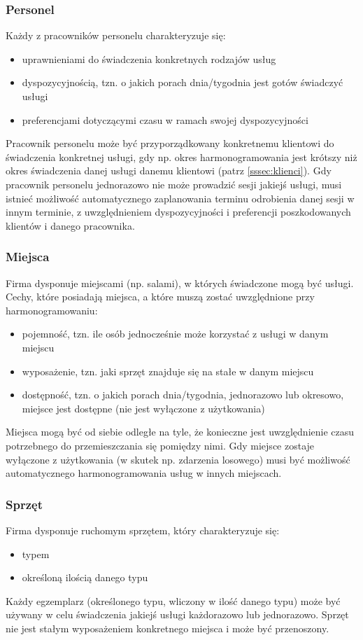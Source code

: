 \subsubsection{Personel}\label{sssec:personel}
Każdy z pracowników personelu charakteryzuje się:
\begin{itemize}
	\item{uprawnieniami do świadczenia konkretnych rodzajów usług}
	\item{dyspozycyjnością, tzn. o jakich porach dnia/tygodnia jest gotów świadczyć usługi}
	\item{preferencjami dotyczącymi czasu w ramach swojej dyspozycyjności}
\end{itemize}
Pracownik personelu może być przyporządkowany konkretnemu klientowi do świadczenia konkretnej usługi, gdy np. okres harmonogramowania jest krótszy niż okres świadczenia danej usługi danemu klientowi (patrz \ref{sssec:klienci}).
Gdy pracownik personelu jednorazowo nie może prowadzić sesji jakiejś usługi, musi istnieć możliwość automatycznego zaplanowania terminu odrobienia danej sesji w innym terminie, z uwzględnieniem dyspozycyjności i preferencji poszkodowanych klientów i danego pracownika.

\subsubsection{Miejsca}\label{sssec:miejsca}
Firma dysponuje miejscami (np. salami), w których świadczone mogą być usługi. Cechy, które posiadają miejsca, a które muszą zostać uwzględnione przy harmonogramowaniu:
\begin{itemize}
	\item{pojemność, tzn. ile osób jednocześnie może korzystać z usługi w danym miejscu}
	\item{wyposażenie, tzn. jaki sprzęt znajduje się na stałe w danym miejscu}
	\item{dostępność, tzn. o jakich porach dnia/tygodnia, jednorazowo lub okresowo, miejsce jest dostępne (nie jest wyłączone z użytkowania)}
\end{itemize}
Miejsca mogą być od siebie odległe na tyle, że konieczne jest uwzględnienie czasu potrzebnego do przemieszczania się pomiędzy nimi.
Gdy miejsce zostaje wyłączone z użytkowania (w skutek np. zdarzenia losowego) musi być możliwość automatycznego harmonogramowania usług w innych miejscach.

\subsubsection{Sprzęt}\label{sssec:sprzet}
Firma dysponuje ruchomym sprzętem, który charakteryzuje się:
\begin{itemize}
	\item{typem}
	\item{określoną ilością danego typu}
\end{itemize}
Każdy egzemplarz (określonego typu, wliczony w ilość danego typu) może być używany w celu świadczenia jakiejś usługi każdorazowo lub jednorazowo.
Sprzęt nie jest stałym wyposażeniem konkretnego miejsca i może być przenoszony.

